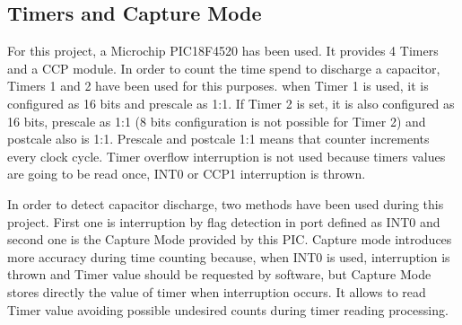 \subsection{Timers and Capture Mode}\label{S:Res:Code:Timers}
For this project, a Microchip PIC18F4520 has been used. It provides 4 Timers and a CCP  module. In order to count the time spend to discharge a capacitor, Timers 1 and 2 have been used for this purposes. when Timer 1 is used, it is configured as 16 bits and prescale as 1:1. If Timer 2 is set, it is also configured as 16 bits, prescale as 1:1 (8 bits configuration is not possible for Timer 2) and postcale also is 1:1. Prescale and postcale 1:1 means that counter increments every clock cycle. Timer overflow interruption is not used because timers values are going to be read once, INT0 or CCP1 interruption is thrown.

In order to detect capacitor discharge, two methods have been used during this project. First one is interruption by flag detection in port defined as INT0 and second one is the Capture Mode provided by this PIC. Capture mode introduces more accuracy during time counting because, when INT0 is used, interruption is thrown and Timer value should be requested by software, but Capture Mode stores directly the value of timer when interruption occurs. It allows to read Timer value avoiding possible undesired counts during timer reading processing.